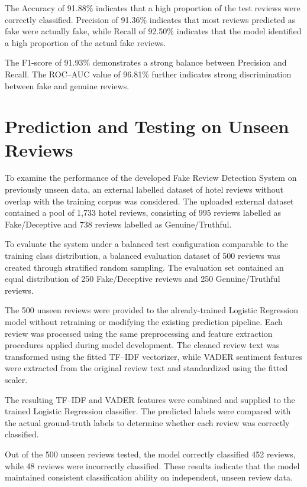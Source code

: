 \documentclass[12pt,a4paper]{report}
\begin{document}
The Accuracy of 91.88\% indicates that a high proportion of the test
reviews were correctly classified. Precision of 91.36\% indicates
that most reviews predicted as fake were actually fake, while Recall
of 92.50\% indicates that the model identified a high proportion of
the actual fake reviews.

The F1-score of 91.93\% demonstrates a strong balance between
Precision and Recall. The ROC--AUC value of 96.81\% further indicates
strong discrimination between fake and genuine reviews.


\section{Prediction and Testing on Unseen Reviews}

To examine the performance of the developed Fake Review
Detection System on previously unseen data, an external
labelled dataset of hotel reviews without overlap with
the training corpus was considered. The uploaded external
dataset contained a pool of 1,733 hotel reviews, consisting
of 995 reviews labelled as Fake/Deceptive and 738 reviews
labelled as Genuine/Truthful.

To evaluate the system under a balanced test configuration
comparable to the training class distribution, a balanced
evaluation dataset of 500 reviews was created through
stratified random sampling. The evaluation set contained
an equal distribution of 250 Fake/Deceptive reviews
and 250 Genuine/Truthful reviews.

The 500 unseen reviews were provided to the already-trained
Logistic Regression model without retraining or modifying
the existing prediction pipeline. Each review was processed
using the same preprocessing and feature extraction procedures
applied during model development. The cleaned review text
was transformed using the fitted TF--IDF vectorizer, while
VADER sentiment features were extracted from the original
review text and standardized using the fitted scaler.

The resulting TF--IDF and VADER features were combined
and supplied to the trained Logistic Regression
classifier. The predicted labels were compared with
the actual ground-truth labels to determine whether each
review was correctly classified.

Out of the 500 unseen reviews tested, the model correctly
classified 452 reviews, while 48 reviews were
incorrectly classified. These results indicate that
the model maintained consistent classification ability
on independent, unseen review data.
\end{document}

